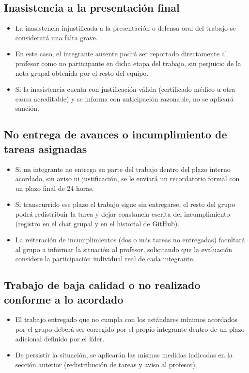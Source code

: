\documentclass[11pt,a4paper]{article}
\begin{document}
\subsection{Inasistencia a la presentaci\'on final}

\begin{itemize}[label=--]
    \item La inasistencia injustificada a la presentaci\'on o defensa oral del trabajo se considerar\'a una falta grave.
    \item En este caso, el integrante ausente podr\'a ser reportado directamente al profesor como no participante en dicha etapa del trabajo, sin perjuicio de la nota grupal obtenida por el resto del equipo.
    \item Si la inasistencia cuenta con justificaci\'on v\'alida (certificado m\'edico u otra causa acreditable) y se informa con anticipaci\'on razonable, no se aplicar\'a sanci\'on.
\end{itemize}

\subsection{No entrega de avances o incumplimiento de tareas asignadas}

\begin{itemize}[label=--]
    \item Si un integrante no entrega su parte del trabajo dentro del plazo interno acordado, sin aviso ni justificaci\'on, se le enviar\'a un recordatorio formal con un plazo final de 24 horas.
    \item Si transcurrido ese plazo el trabajo sigue sin entregarse, el resto del grupo podr\'a redistribuir la tarea y dejar constancia escrita del incumplimiento (registro en el chat grupal y en el historial de GitHub).
    \item La reiteraci\'on de incumplimientos (dos o m\'as tareas no entregadas) facultar\'a al grupo a informar la situaci\'on al profesor, solicitando que la evaluaci\'on considere la participaci\'on individual real de cada integrante.
\end{itemize}

\subsection{Trabajo de baja calidad o no realizado conforme a lo acordado}

\begin{itemize}[label=--]
    \item El trabajo entregado que no cumpla con los est\'andares m\'inimos acordados por el grupo deber\'a ser corregido por el propio integrante dentro de un plazo adicional definido por el l\'ider.
    \item De persistir la situaci\'on, se aplicar\'an las mismas medidas indicadas en la secci\'on anterior (redistribuci\'on de tareas y aviso al profesor).
\end{itemize}
\end{document}
